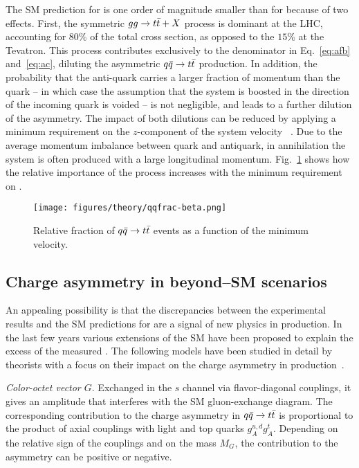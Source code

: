 The SM prediction for \ac{} is one order of magnitude smaller than for
\afb{} because of two effects. First, the symmetric $gg\to t\bar{t}{}+X$
process is dominant at the LHC, accounting for $80\%$ of the total
cross section, as opposed to the $15\%$ at the Tevatron. This process
contributes exclusively to the denominator in Eq.~\ref{eq:afb}
and~\ref{eq:ac}, diluting the asymmetric $q\bar{q}{}\to t\bar{t}{}$
production. In addition, the probability that the anti-quark carries a
larger fraction of momentum than the quark -- in which case the
assumption that the \ttbar{} system is boosted in the direction of the
incoming quark is voided -- is not negligible, and leads to a further
dilution of the asymmetry. The impact of both
dilutions can be reduced by applying a minimum requirement on the
$z$-component of the \ttbar{} system velocity \betatt{}~\cite{AguilarSaavedra:2011cp}. Due to the average momentum imbalance
between quark and antiquark, in \qqbar{} annihilation the \ttbar{}
system is often produced with a large longitudinal
momentum. Fig.~\ref{fig:qqbarfrac} shows how the relative importance
of the \qqbar{} process increases with the minimum requirement on \betatt{}.

\begin{figure}[!htb]
  \centering
  \texttt{[image: figures/theory/qqfrac-beta.png]} 
  \caption{Relative fraction of $q\bar{q}{}\to t\bar{t}{}$ events as a function of the
    minimum \ttbar{} velocity.} 
  \label{fig:qqbarfrac}
\end{figure}

\subsection{Charge asymmetry in beyond--SM scenarios}
\label{sec:bsmca}

An appealing possibility is that the discrepancies between the
experimental results and the SM predictions for \afb{} are a signal of
new physics in \ttbar{} production. In the last few years various
extensions of the SM have been proposed to explain the excess of the
measured \afb{}. The following models have been studied in
detail by theorists with a focus on their impact on the charge
asymmetry in \ttbar{} production~\cite{Aguilar-Saavedra:2014kpa}. 

{\em Color-octet vector $G$}. Exchanged in the $s$ channel via
flavor-diagonal couplings, it gives 
an amplitude that interferes with the SM gluon-exchange diagram. The
corresponding contribution to the charge asymmetry in
$q\bar{q}{}\to t\bar{t}{}$ is proportional to the product of axial
couplings with light and top quarks $g_A^{u,d}g_A^t$. Depending on the
relative sign of the couplings and on the mass $M_G$, the contribution
to the asymmetry can be positive or negative. 

